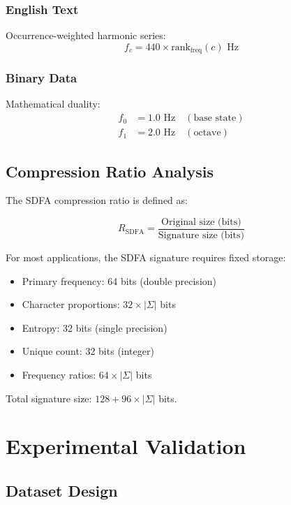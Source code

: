 \documentclass[journal]{IEEEtran}
\newcommand{\sdfa}{\textsc{SDFA}}
\begin{document}
\subsubsection{English Text}
Occurrence-weighted harmonic series:
\begin{equation}
f_c = 440 \times \text{rank}_{\text{freq}}(c) \text{ Hz}
\end{equation}

\subsubsection{Binary Data}
Mathematical duality:
\begin{align}
f_0 &= 1.0 \text{ Hz} \quad (\text{base state}) \\
f_1 &= 2.0 \text{ Hz} \quad (\text{octave})
\end{align}

\subsection{Compression Ratio Analysis}

The \sdfa{} compression ratio is defined as:

\begin{equation}
R_{\text{SDFA}} = \frac{\text{Original size (bits)}}{\text{Signature size (bits)}}
\end{equation}

For most applications, the \sdfa{} signature requires fixed storage:
\begin{itemize}
    \item Primary frequency: 64 bits (double precision)
    \item Character proportions: $32 \times |\Sigma|$ bits
    \item Entropy: 32 bits (single precision)
    \item Unique count: 32 bits (integer)
    \item Frequency ratios: $64 \times |\Sigma|$ bits
\end{itemize}

Total signature size: $128 + 96 \times |\Sigma|$ bits.

\section{Experimental Validation}

\subsection{Dataset Design}
\end{document}
